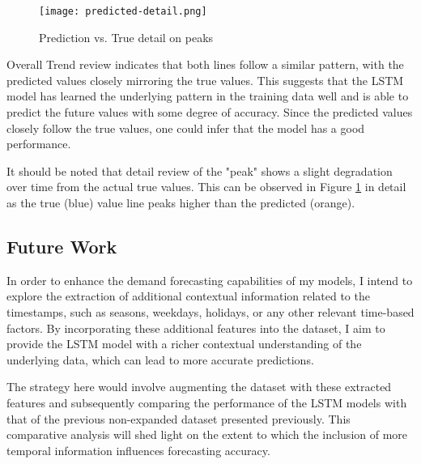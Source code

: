 \documentclass[10pt, journal, letterpaper, compsoc]{IEEEtran}
\begin{document}
\begin{figure}[h]
\centering
\captionsetup{justification=centering,margin=1cm}
\texttt{[image: predicted-detail.png]}
\caption{Prediction vs. True detail on peaks}
\label{fig:prediction-detail}
\end{figure}

Overall Trend review indicates that both lines follow a similar pattern, with the predicted values closely mirroring the true values. This suggests that the LSTM model has learned the underlying pattern in the training data well and is able to predict the future values with some degree of accuracy. Since the predicted values closely follow the true values, one could infer that the model has a good performance. 

It should be noted that detail review of the "peak" shows a slight degradation over time from the actual true values. This can be observed in Figure \ref{fig:prediction-detail} in detail as the true (blue) value line peaks higher than the predicted (orange).

\subsection{Future Work}
In order to enhance the demand forecasting capabilities of my models, I intend to explore the extraction of additional contextual information related to the timestamps, such as seasons, weekdays, holidays, or any other relevant time-based factors. By incorporating these additional features into the dataset, I aim to provide the LSTM model with a richer contextual understanding of the underlying data, which can lead to more accurate predictions.

The strategy here would involve augmenting the dataset with these extracted features and subsequently comparing the performance of the LSTM models with that of the previous non-expanded dataset presented previously. This comparative analysis will shed light on the extent to which the inclusion of more temporal information influences forecasting accuracy.



\clearpage
\printbibliography %
\end{document}
